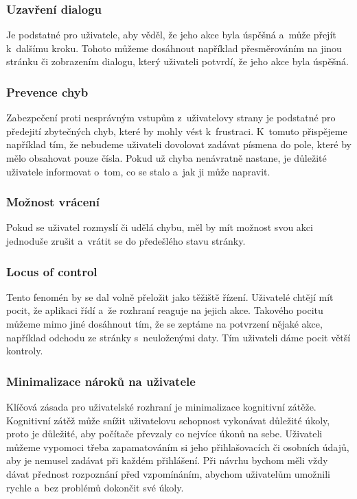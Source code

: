 \subsubsection*{Uzavření dialogu}
Je podstatné pro uživatele, aby věděl, že jeho akce byla úspěšná a~může přejít k~dalšímu kroku. Tohoto můžeme dosáhnout například přesměrováním na jinou stránku či zobrazením dialogu, který uživateli potvrdí, že jeho akce byla úspěšná.

\subsubsection*{Prevence chyb}
Zabezpečení proti nesprávným vstupům z~uživatelovy strany je podstatné pro předejití zbytečných chyb, které by mohly vést k~frustraci. K~tomuto přispějeme například tím, že nebudeme uživateli dovolovat zadávat písmena do pole, které by mělo obsahovat pouze čísla. Pokud už chyba nenávratně nastane, je důležité uživatele informovat o~tom, co se stalo a~jak ji může napravit.

\subsubsection*{Možnost vrácení}
Pokud se uživatel rozmyslí či udělá chybu, měl by mít možnost svou akci jednoduše zrušit a~vrátit se do předešlého stavu stránky.

\subsubsection*{Locus of control}
Tento fenomén by se dal volně přeložit jako těžiště řízení. Uživatelé chtějí mít pocit, že aplikaci řídí a~že rozhraní reaguje na jejich akce. Takového pocitu můžeme mimo jiné dosáhnout tím, že se zeptáme na potvrzení nějaké akce, například odchodu ze stránky s~neuloženými daty. Tím uživateli dáme pocit větší kontroly.

\subsubsection*{Minimalizace nároků na uživatele}
Klíčová zásada pro uživatelské rozhraní je minimalizace kognitivní zátěže. Kognitivní zátěž může snížit uživatelovu schopnost vykonávat důležité úkoly, proto je důležité, aby počítače převzaly co nejvíce úkonů na sebe. Uživateli můžeme vypomoci třeba zapamatováním si jeho přihlašovacích či osobních údajů, aby je nemusel zadávat při každém přihlášení. Při návrhu bychom měli vždy dávat přednost rozpoznání před vzpomínáním, abychom uživatelům umožnili rychle a~bez problémů dokončit své úkoly.

